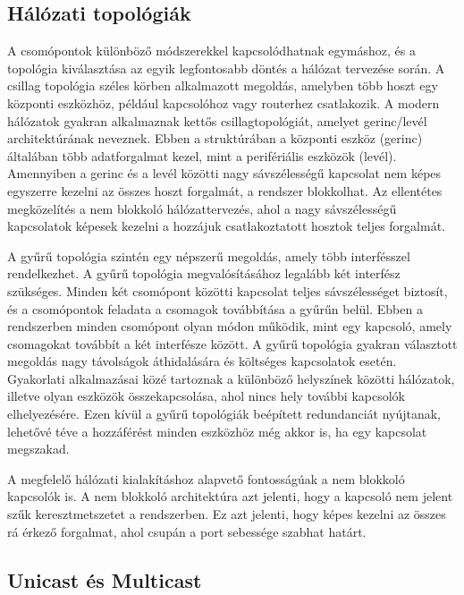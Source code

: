 \subsection{Hálózati topológiák}
A csomópontok különböző módszerekkel kapcsolódhatnak egymáshoz, és a topológia kiválasztása az 
egyik legfontosabb döntés a hálózat tervezése során. A csillag topológia széles körben 
alkalmazott megoldás, amelyben több hoszt egy központi eszközhöz, például kapcsolóhoz vagy 
routerhez csatlakozik. A modern hálózatok gyakran alkalmaznak kettős csillagtopológiát, 
amelyet gerinc/levél architektúrának neveznek. Ebben a struktúrában a központi eszköz (gerinc) 
általában több adatforgalmat kezel, mint a perifériális eszközök (levél). Amennyiben a 
gerinc és a levél közötti nagy sávszélességű kapcsolat nem képes egyszerre kezelni az 
összes hoszt forgalmát, a rendszer blokkolhat. Az ellentétes megközelítés a nem blokkoló 
hálózattervezés, ahol a nagy sávszélességű kapcsolatok képesek kezelni a hozzájuk csatlakoztatott hosztok teljes forgalmát.

A gyűrű topológia szintén egy népszerű megoldás, amely több interfésszel rendelkezhet. 
A gyűrű topológia megvalósításához legalább két interfész szükséges. 
Minden két csomópont közötti kapcsolat teljes sávszélességet biztosít, és a csomópontok 
feladata a csomagok továbbítása a gyűrűn belül. Ebben a rendszerben minden csomópont 
olyan módon működik, mint egy kapcsoló, amely csomagokat továbbít a két interfésze között. 
A gyűrű topológia gyakran választott megoldás nagy távolságok áthidalására és költséges kapcsolatok esetén. 
Gyakorlati alkalmazásai közé tartoznak a különböző helyszínek közötti hálózatok, illetve olyan 
eszközök összekapcsolása, ahol nincs hely további kapcsolók elhelyezésére. Ezen kívül a gyűrű 
topológiák beépített redundanciát nyújtanak, lehetővé téve a hozzáférést minden eszközhöz még akkor is, ha egy kapcsolat megszakad.

A megfelelő hálózati kialakításhoz alapvető fontosságúak a nem blokkoló kapcsolók is. 
A nem blokkoló architektúra azt jelenti, hogy a kapcsoló nem jelent szűk keresztmetszetet a rendszerben. Ez azt jelenti, hogy képes kezelni az összes rá érkező forgalmat, ahol csupán a port sebessége szabhat határt.

\subsection{Unicast és Multicast} %

